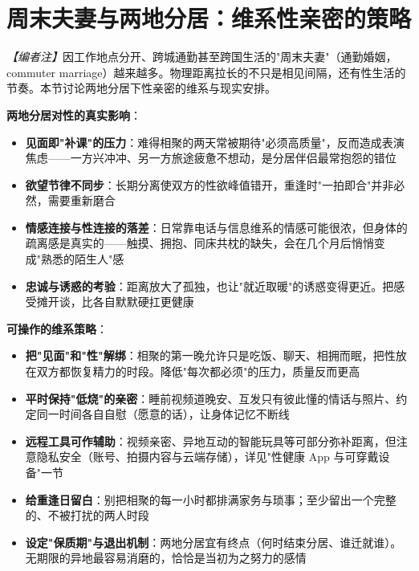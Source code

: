 \section{周末夫妻与两地分居：维系性亲密的策略}

\noindent\textit{【编者注】}因工作地点分开、跨城通勤甚至跨国生活的"周末夫妻"（通勤婚姻，commuter marriage）越来越多。物理距离拉长的不只是相见间隔，还有性生活的节奏。本节讨论两地分居下性亲密的维系与现实安排。

\vspace{0.5em}
\noindent\textbf{两地分居对性的真实影响}：

\begin{itemize}
	\item \textbf{见面即"补课"的压力}：难得相聚的两天常被期待"必须高质量"，反而造成表演焦虑——一方兴冲冲、另一方旅途疲惫不想动，是分居伴侣最常抱怨的错位
	\item \textbf{欲望节律不同步}：长期分离使双方的性欲峰值错开，重逢时"一拍即合"并非必然，需要重新磨合
	\item \textbf{情感连接与性连接的落差}：日常靠电话与信息维系的情感可能很浓，但身体的疏离感是真实的——触摸、拥抱、同床共枕的缺失，会在几个月后悄悄变成"熟悉的陌生人"感
	\item \textbf{忠诚与诱惑的考验}：距离放大了孤独，也让"就近取暖"的诱惑变得更近。把感受摊开谈，比各自默默硬扛更健康
\end{itemize}

\vspace{0.5em}
\noindent\textbf{可操作的维系策略}：

\begin{itemize}
	\item \textbf{把"见面"和"性"解绑}：相聚的第一晚允许只是吃饭、聊天、相拥而眠，把性放在双方都恢复精力的时段。降低"每次都必须"的压力，质量反而更高
	\item \textbf{平时保持"低烧"的亲密}：睡前视频道晚安、互发只有彼此懂的情话与照片、约定同一时间各自自慰（愿意的话），让身体记忆不断线
	\item \textbf{远程工具可作辅助}：视频亲密、异地互动的智能玩具等可部分弥补距离，但注意隐私安全（账号、拍摄内容与云端存储），详见"性健康 App 与可穿戴设备"一节
	\item \textbf{给重逢日留白}：别把相聚的每一小时都排满家务与琐事；至少留出一个完整的、不被打扰的两人时段
	\item \textbf{设定"保质期"与退出机制}：两地分居宜有终点（何时结束分居、谁迁就谁）。无期限的异地最容易消磨的，恰恰是当初为之努力的感情
\end{itemize}

